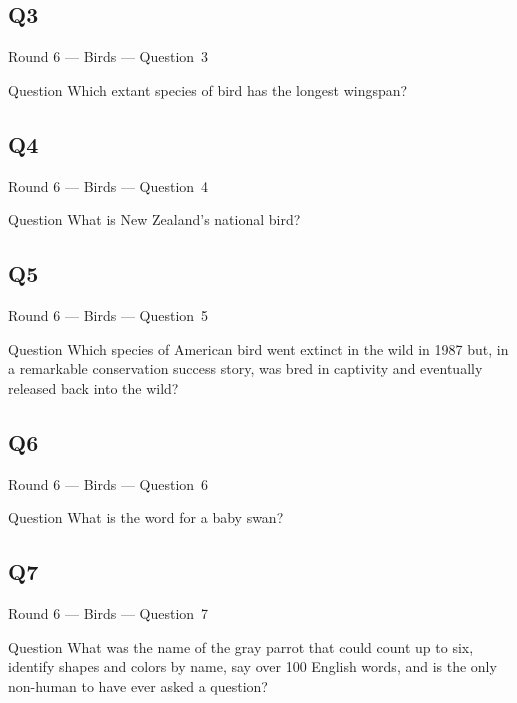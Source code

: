 \documentclass[11pt]{beamer}
\begin{document}
\subsection*{Q3}
\begin{frame}[t]{Round 6 --- Birds --- \mbox{Question 3}}
\vspace{-0.5em}
\begin{block}{Question}
Which extant species of bird has the longest wingspan?
\end{block}
\end{frame}
\subsection*{Q4}
\begin{frame}[t]{Round 6 --- Birds --- \mbox{Question 4}}
\vspace{-0.5em}
\begin{block}{Question}
What is New Zealand's national bird?
\end{block}
\end{frame}
\subsection*{Q5}
\begin{frame}[t]{Round 6 --- Birds --- \mbox{Question 5}}
\vspace{-0.5em}
\begin{block}{Question}
Which species of American bird went extinct in the wild in 1987 but, in a remarkable conservation success story, was bred in captivity and eventually released back into the wild?
\end{block}
\end{frame}
\subsection*{Q6}
\begin{frame}[t]{Round 6 --- Birds --- \mbox{Question 6}}
\vspace{-0.5em}
\begin{block}{Question}
What is the word for a baby swan?
\end{block}
\end{frame}
\subsection*{Q7}
\begin{frame}[t]{Round 6 --- Birds --- \mbox{Question 7}}
\vspace{-0.5em}
\begin{block}{Question}
What was the name of the gray parrot that could count up to six, identify shapes and colors by name, say over 100 English words, and is the only non-human to have ever asked a question?
\end{block}
\end{frame}
\end{document}
